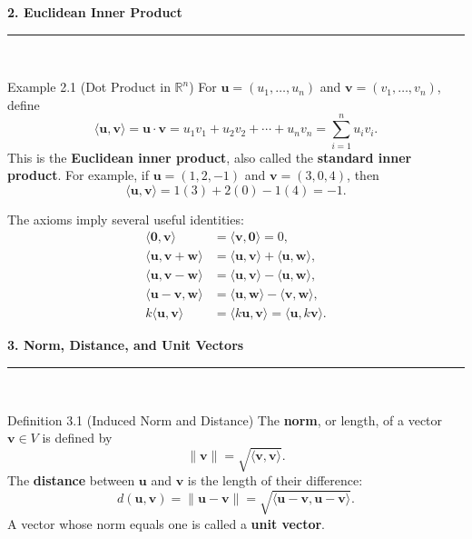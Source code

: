\documentclass[11pt,letterpaper]{article}
\newcommand{\manualsection}[1]{%
  \Needspace{16\baselineskip}%
  \vspace{0.35cm}
  {\Large\bfseries\color{blackmain} #1}\\[2pt]
  {\color{orangeacc}\rule{\linewidth}{1.4pt}}\\[0.25cm]
}
\newcommand{\term}[1]{\textbf{\color{orangeacc}#1}}
\newcommand{\termb}[1]{\textbf{\color{blackmain}#1}}
\begin{document}
\manualsection{2. Euclidean Inner Product}

\begin{examplebox}{Example 2.1 (Dot Product in $\mathbb{R}^n$)}
For $\mathbf{u}=(u_1,\ldots,u_n)$ and $\mathbf{v}=(v_1,\ldots,v_n)$, define
\begin{equation}
  \langle\mathbf{u},\mathbf{v}\rangle
  =\mathbf{u}\cdot\mathbf{v}
  =u_1v_1+u_2v_2+\cdots+u_nv_n
  =\sum_{i=1}^{n}u_iv_i.
\end{equation}
This is the \termb{Euclidean inner product}, also called the \termb{standard inner product}.
For example, if $\mathbf{u}=(1,2,-1)$ and $\mathbf{v}=(3,0,4)$, then
\[
  \langle\mathbf{u},\mathbf{v}\rangle=1(3)+2(0)-1(4)=-1.
\]
\end{examplebox}

The axioms imply several useful identities:
\begin{align}
  \langle\mathbf{0},\mathbf{v}\rangle
    &=\langle\mathbf{v},\mathbf{0}\rangle=0,\\
  \langle\mathbf{u},\mathbf{v}+\mathbf{w}\rangle
    &=\langle\mathbf{u},\mathbf{v}\rangle+\langle\mathbf{u},\mathbf{w}\rangle,\\
  \langle\mathbf{u},\mathbf{v}-\mathbf{w}\rangle
    &=\langle\mathbf{u},\mathbf{v}\rangle-\langle\mathbf{u},\mathbf{w}\rangle,\\
  \langle\mathbf{u}-\mathbf{v},\mathbf{w}\rangle
    &=\langle\mathbf{u},\mathbf{w}\rangle-\langle\mathbf{v},\mathbf{w}\rangle,\\
  k\langle\mathbf{u},\mathbf{v}\rangle
    &=\langle k\mathbf{u},\mathbf{v}\rangle
     =\langle\mathbf{u},k\mathbf{v}\rangle.
\end{align}

\manualsection{3. Norm, Distance, and Unit Vectors}

\begin{infobox}[blackmain]{Definition 3.1 (Induced Norm and Distance)}
The \term{norm}, or length, of a vector $\mathbf{v}\in V$ is defined by
\begin{equation}
  \|\mathbf{v}\|=\sqrt{\langle\mathbf{v},\mathbf{v}\rangle}.
\end{equation}
The \term{distance} between $\mathbf{u}$ and $\mathbf{v}$ is the length of their difference:
\begin{equation}
  d(\mathbf{u},\mathbf{v})=\|\mathbf{u}-\mathbf{v}\|
  =\sqrt{\langle\mathbf{u}-\mathbf{v},\mathbf{u}-\mathbf{v}\rangle}.
\end{equation}
A vector whose norm equals one is called a \termb{unit vector}.
\end{infobox}
\end{document}
